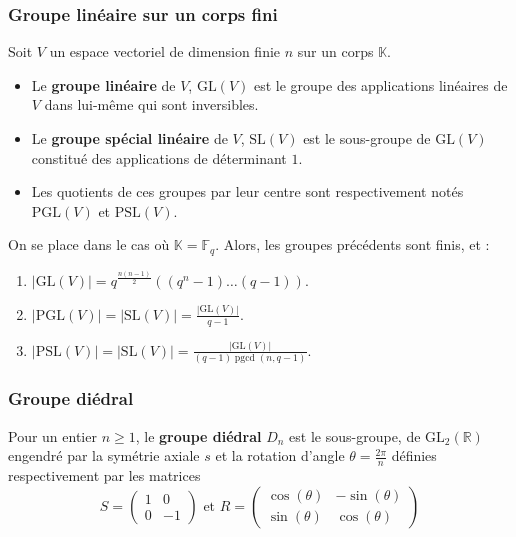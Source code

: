 	\subsubsection{Groupe linéaire sur un corps fini}


	Soit $V$ un espace vectoriel de dimension finie $n$ sur un corps $\mathbb{K}$.

	\begin{definition}
		\begin{itemize}
			\item Le \textbf{groupe linéaire} de $V$, $\mathrm{GL}(V)$ est le groupe des applications linéaires de $V$ dans lui-même qui sont inversibles.
			\item Le \textbf{groupe spécial linéaire} de $V$, $\mathrm{SL}(V)$ est le sous-groupe de $\mathrm{GL}(V)$ constitué des applications de déterminant $1$.
			\item Les quotients de ces groupes par leur centre sont respectivement notés $\mathrm{PGL}(V)$ et $\mathrm{PSL}(V)$.
		\end{itemize}
	\end{definition}


	\begin{proposition}
		On se place dans le cas où $\mathbb{K} = \mathbb{F}_q$. Alors, les groupes précédents sont finis, et :
		\begin{enumerate}[label=(\roman*)]
			\item $|\mathrm{GL}(V)| = q^{\frac{n(n-1)}{2}}((q^n-1) \dots (q-1))$.
			\item $|\mathrm{PGL}(V)| = |\mathrm{SL}(V)| = \frac{|\mathrm{GL}(V)|}{q-1}$.
			\item $|\mathrm{PSL}(V)| = |\mathrm{SL}(V)| = \frac{|\mathrm{GL}(V)|}{(q-1)\operatorname{pgcd}(n,q-1)}$.
		\end{enumerate}
	\end{proposition}

	\subsubsection{Groupe diédral}


	\begin{definition}
		Pour un entier $n \geq 1$, le \textbf{groupe diédral} $D_n$ est le sous-groupe, de $\mathrm{GL}_2(\mathbb{R})$ engendré par la symétrie axiale $s$ et la rotation d'angle $\theta = \frac{2\pi}{n}$ définies respectivement par les matrices
		\[
		S =
		\begin{pmatrix}
			1 & 0 \\
			0 & -1
		\end{pmatrix}
		\text{ et }
		R =
		\begin{pmatrix}
			\cos(\theta) & -\sin(\theta) \\
			\sin(\theta) & \cos(\theta)
		\end{pmatrix}
		\]
	\end{definition}

